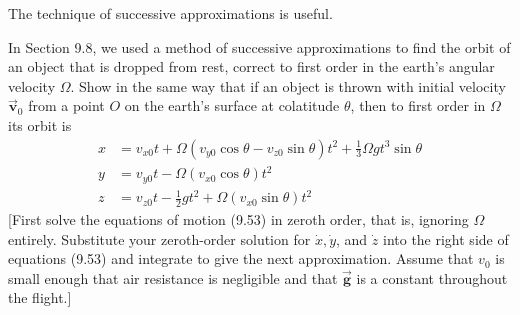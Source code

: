 \documentclass[11pt,letterpaper,boxed]{../hmcpsetrhino}
\newcommand{\half}{\frac{1}{2}}
\let\oldvec\vec
\renewcommand{\vec}[1]{\oldvec{\mathbf{#1}}}
\begin{document}
\newpage 

\begin{problem}[ii]
The technique of successive approximations is useful.

\begin{problem}[9.26]
In Section 9.8, we used a method of successive approximations to find the orbit of an object that is dropped from rest, correct to first order in the earth's angular velocity $\Omega$. Show in the same way that if an object is thrown with initial velocity $\vec v_0$ from a point $O$ on the earth's surface at colatitude $\theta$, then to first order in $\Omega$ its orbit is
\begin{align*}
x &= v_{x0} t + \Omega (v_{y0} \cos \theta - v_{z0} \sin \theta )t^2 + \frac{1}{3}\Omega g t^3 \sin \theta \\
y &= v_{y0}t - \Omega (v_{x0} \cos \theta) t^2\\
z &= v_{z0} t - \half g t^2 + \Omega (v_{x0} \sin \theta ) t^2
\end{align*}
[First solve the equations of motion (9.53) in zeroth order, that is, ignoring $\Omega$ entirely. Substitute your zeroth-order solution for $\dot x, \dot y$, and $\dot z$ into the right side of equations (9.53) and integrate to give the next approximation. Assume that $v_0$ is small enough that air resistance is negligible and that $\vec g$ is a constant throughout the flight.]

\end{problem}
\end{problem}
\begin{solution}


\vfill
\end{solution}


\newpage
\end{document}
